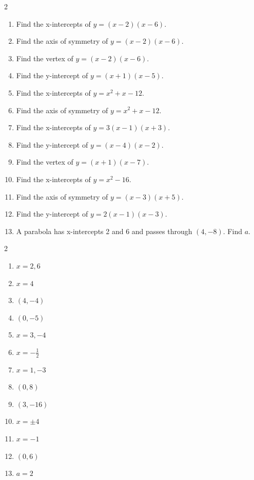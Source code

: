 \documentclass[11pt]{article}
\begin{document}
\begin{recapbox}
\begin{multicols}{2}
\small
\begin{enumerate}[leftmargin=*,itemsep=3pt]
  \item Find the x-intercepts of $y=(x-2)(x-6)$.
  \item Find the axis of symmetry of $y=(x-2)(x-6)$.
  \item Find the vertex of $y=(x-2)(x-6)$.
  \item Find the y-intercept of $y=(x+1)(x-5)$.
  \item Find the x-intercepts of $y=x^2+x-12$.
  \item Find the axis of symmetry of $y=x^2+x-12$.
  \item Find the x-intercepts of $y=3(x-1)(x+3)$.
  \item Find the y-intercept of $y=(x-4)(x-2)$.
  \item Find the vertex of $y=(x+1)(x-7)$.
  \item Find the x-intercepts of $y=x^2-16$.
  \item Find the axis of symmetry of $y=(x-3)(x+5)$.
  \item Find the y-intercept of $y=2(x-1)(x-3)$.
  \item A parabola has x-intercepts 2 and 6 and passes through $(4,-8)$. Find $a$.
\end{enumerate}
\end{multicols}
\end{recapbox}

\begin{keybox}
\begin{multicols}{2}
\small
\begin{enumerate}[leftmargin=*,itemsep=3pt]
  \item $x=2,6$
  \item $x=4$
  \item $(4,-4)$
  \item $(0,-5)$
  \item $x=3,-4$
  \item $x=-\tfrac12$
  \item $x=1,-3$
  \item $(0,8)$
  \item $(3,-16)$
  \item $x=\pm4$
  \item $x=-1$
  \item $(0,6)$
  \item $a=2$
\end{enumerate}
\end{multicols}
\end{keybox}
\end{document}
